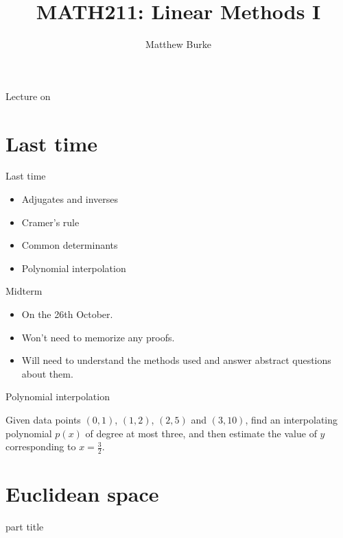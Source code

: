 \documentclass{beamer}
\title{MATH211: Linear Methods I}
\author{Matthew Burke}
\date{\lectureDate}
\newcommand{\lectureDate}{\formatdate{09}{10}{2018}}
\begin{document}
\frame{\titlepage}

\begin{frame}{Lecture on \lectureDate}
  \tableofcontents
\end{frame}

\section*{Last time}

\begin{frame}{Last time}
  \begin{itemize}
  \item Adjugates and inverses\vfill
  \item Cramer's rule\vfill
  \item Common determinants\vfill
  \item Polynomial interpolation\vfill
  \end{itemize}
\end{frame}

\begin{frame}{Midterm}
  \begin{itemize}
  \item On the 26th October.
  \item Won't need to memorize any proofs.
  \item Will need to understand the methods used and answer abstract questions about them.
  \end{itemize}
\end{frame}

\begin{frame}{Polynomial interpolation}
  \begin{example}
    Given data points $(0,1)$, $(1,2)$, $(2,5)$ and $(3,10)$,
    find an interpolating polynomial 
    $p(x)$ of degree at most three, 
    and then estimate the value of $y$ corresponding to $x=\frac{3}{2}$.
  \end{example}
\end{frame}

\section{Euclidean space}

\begin{frame}
  \begin{beamercolorbox}[sep=12pt,center]{part title}
    \insertsection\par
  \end{beamercolorbox}
\end{frame}
\end{document}
